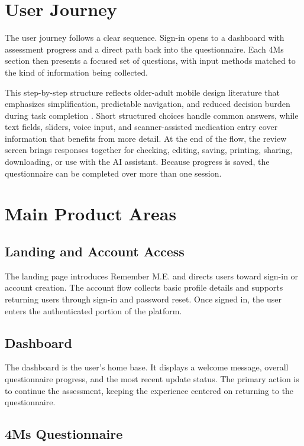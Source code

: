 \documentclass[11pt]{article}
\begin{document}
\section{User Journey}

The user journey follows a clear sequence. Sign-in opens to a dashboard with assessment progress and a direct path back into the questionnaire. Each 4Ms section then presents a focused set of questions, with input methods matched to the kind of information being collected.

This step-by-step structure reflects older-adult mobile design literature that emphasizes simplification, predictable navigation, and reduced decision burden during task completion \cite{gomez-hernandez-older-adult-guidelines}. Short structured choices handle common answers, while text fields, sliders, voice input, and scanner-assisted medication entry cover information that benefits from more detail. At the end of the flow, the review screen brings responses together for checking, editing, saving, printing, sharing, downloading, or use with the AI assistant. Because progress is saved, the questionnaire can be completed over more than one session.

\section{Main Product Areas}

\subsection{Landing and Account Access}

The landing page introduces Remember M.E. and directs users toward sign-in or account creation. The account flow collects basic profile details and supports returning users through sign-in and password reset. Once signed in, the user enters the authenticated portion of the platform.

\subsection{Dashboard}

The dashboard is the user's home base. It displays a welcome message, overall questionnaire progress, and the most recent update status. The primary action is to continue the assessment, keeping the experience centered on returning to the questionnaire.

\subsection{4Ms Questionnaire}
\end{document}
